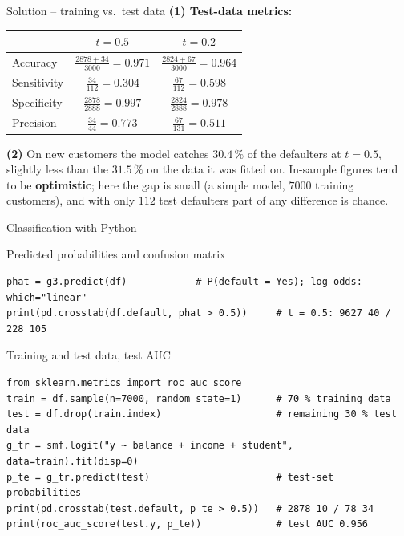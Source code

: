 \documentclass[aspectratio=169,11pt]{beamer}
\begin{document}
\begin{frame}{Solution -- training vs.\ test data}
  \textbf{(1) Test-data metrics:}
  \begin{center}
    \renewcommand{\arraystretch}{1.2}
    \begin{tabular}{lcc}
      \toprule
      & $t=0.5$ & $t=0.2$\\
      \midrule
      Accuracy & $\frac{2878+34}{3000}=0.971$ & $\frac{2824+67}{3000}=0.964$\\[2pt]
      Sensitivity & $\frac{34}{112}=0.304$ & $\frac{67}{112}=0.598$\\[2pt]
      Specificity & $\frac{2878}{2888}=0.997$ & $\frac{2824}{2888}=0.978$\\[2pt]
      Precision & $\frac{34}{44}=0.773$ & $\frac{67}{131}=0.511$\\
      \bottomrule
    \end{tabular}
  \end{center}
  \textbf{(2)} On new customers the model catches $30.4\,\%$ of the
  defaulters at $t=0.5$, slightly less than the $31.5\,\%$ on the data it was
  fitted on. In-sample figures tend to be \textbf{optimistic}; here the gap is
  small (a simple model, $7000$ training customers), and with only $112$ test
  defaulters part of any difference is chance.

  \medskip
\end{frame}

\begin{frame}[fragile]{Classification with Python}
  \begin{block}{Predicted probabilities and confusion matrix}
\begin{lstlisting}
phat = g3.predict(df)            # P(default = Yes); log-odds: which="linear"
print(pd.crosstab(df.default, phat > 0.5))     # t = 0.5: 9627 40 / 228 105
\end{lstlisting}
  \end{block}
  \begin{block}{Training and test data, test AUC}
\begin{lstlisting}
from sklearn.metrics import roc_auc_score
train = df.sample(n=7000, random_state=1)      # 70 % training data
test = df.drop(train.index)                    # remaining 30 % test data
g_tr = smf.logit("y ~ balance + income + student", data=train).fit(disp=0)
p_te = g_tr.predict(test)                      # test-set probabilities
print(pd.crosstab(test.default, p_te > 0.5))   # 2878 10 / 78 34
print(roc_auc_score(test.y, p_te))             # test AUC 0.956
\end{lstlisting}
  \end{block}
\end{frame}
\end{document}
